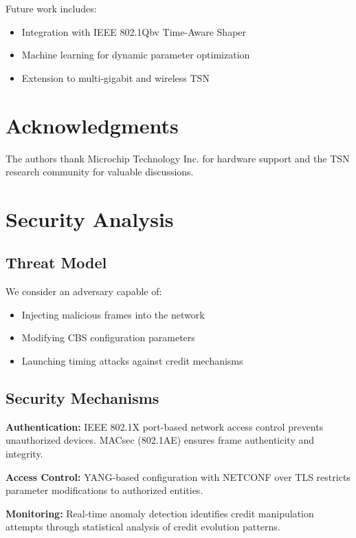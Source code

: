 \documentclass[10pt, journal, compsoc]{IEEEtran}
\begin{document}
Future work includes:
\begin{itemize}
    \item Integration with IEEE 802.1Qbv Time-Aware Shaper
    \item Machine learning for dynamic parameter optimization
    \item Extension to multi-gigabit and wireless TSN
\end{itemize}

\section{Acknowledgments}

The authors thank Microchip Technology Inc. for hardware support and the TSN research community for valuable discussions.




\section{Security Analysis}

\subsection{Threat Model}

We consider an adversary capable of:
\begin{itemize}
    \item Injecting malicious frames into the network
    \item Modifying CBS configuration parameters
    \item Launching timing attacks against credit mechanisms
\end{itemize}

\subsection{Security Mechanisms}

\textbf{Authentication:} IEEE 802.1X port-based network access control prevents unauthorized devices. MACsec (802.1AE) ensures frame authenticity and integrity.

\textbf{Access Control:} YANG-based configuration with NETCONF over TLS restricts parameter modifications to authorized entities.

\textbf{Monitoring:} Real-time anomaly detection identifies credit manipulation attempts through statistical analysis of credit evolution patterns.
\end{document}
